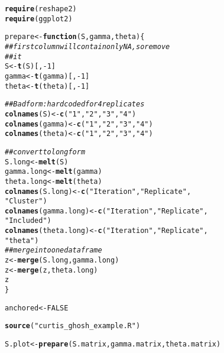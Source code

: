 \documentclass[12pt]{article}\usepackage[]{graphicx}\usepackage[]{color}
\makeatletter
\newcommand{\hlnum}[1]{\textcolor[rgb]{0.686,0.059,0.569}{#1}}%
\newcommand{\hlstr}[1]{\textcolor[rgb]{0.192,0.494,0.8}{#1}}%
\newcommand{\hlcom}[1]{\textcolor[rgb]{0.678,0.584,0.686}{\textit{#1}}}%
\newcommand{\hlopt}[1]{\textcolor[rgb]{0,0,0}{#1}}%
\newcommand{\hlstd}[1]{\textcolor[rgb]{0.345,0.345,0.345}{#1}}%
\newcommand{\hlkwa}[1]{\textcolor[rgb]{0.161,0.373,0.58}{\textbf{#1}}}%
\newcommand{\hlkwb}[1]{\textcolor[rgb]{0.69,0.353,0.396}{#1}}%
\newcommand{\hlkwc}[1]{\textcolor[rgb]{0.333,0.667,0.333}{#1}}%
\newcommand{\hlkwd}[1]{\textcolor[rgb]{0.737,0.353,0.396}{\textbf{#1}}}%
\newenvironment{kframe}{%
 \def\at@end@of@kframe{}%
 \ifinner\ifhmode%
  \def\at@end@of@kframe{\end{minipage}}%
  \begin{minipage}{\columnwidth}%
 \fi\fi%
 \def\FrameCommand##1{\hskip\@totalleftmargin \hskip-\fboxsep
 \colorbox{shadecolor}{##1}\hskip-\fboxsep
     \hskip-\linewidth \hskip-\@totalleftmargin \hskip\columnwidth}%
 \MakeFramed {\advance\hsize-\width
   \@totalleftmargin\z@ \linewidth\hsize
   \@setminipage}}%
 {\par\unskip\endMakeFramed%
 \at@end@of@kframe}
\newenvironment{knitrout}{}{} %
\makeatother
\begin{document}
\begin{knitrout}
\color{fgcolor}\begin{kframe}
\begin{alltt}
\hlkwd{require}\hlstd{(reshape2)}
\hlkwd{require}\hlstd{(ggplot2)}

\hlstd{prepare} \hlkwb{<-} \hlkwa{function}\hlstd{(}\hlkwc{S}\hlstd{,} \hlkwc{gamma}\hlstd{,} \hlkwc{theta}\hlstd{) \{}
  \hlcom{## first column will contain only NA, so remove}
  \hlcom{## it}
  \hlstd{S} \hlkwb{<-} \hlkwd{t}\hlstd{(S)[,} \hlopt{-}\hlnum{1}\hlstd{]}
  \hlstd{gamma} \hlkwb{<-} \hlkwd{t}\hlstd{(gamma)[,} \hlopt{-}\hlnum{1}\hlstd{]}
  \hlstd{theta} \hlkwb{<-} \hlkwd{t}\hlstd{(theta)[,} \hlopt{-}\hlnum{1}\hlstd{]}

  \hlcom{## Bad form: hardcoded for 4 replicates}
  \hlkwd{colnames}\hlstd{(S)} \hlkwb{<-} \hlkwd{c}\hlstd{(}\hlstr{"1"}\hlstd{,} \hlstr{"2"}\hlstd{,} \hlstr{"3"}\hlstd{,} \hlstr{"4"}\hlstd{)}
  \hlkwd{colnames}\hlstd{(gamma)} \hlkwb{<-} \hlkwd{c}\hlstd{(}\hlstr{"1"}\hlstd{,} \hlstr{"2"}\hlstd{,} \hlstr{"3"}\hlstd{,} \hlstr{"4"}\hlstd{)}
  \hlkwd{colnames}\hlstd{(theta)} \hlkwb{<-} \hlkwd{c}\hlstd{(}\hlstr{"1"}\hlstd{,} \hlstr{"2"}\hlstd{,} \hlstr{"3"}\hlstd{,} \hlstr{"4"}\hlstd{)}

  \hlcom{## convert to long form}
  \hlstd{S.long} \hlkwb{<-} \hlkwd{melt}\hlstd{(S)}
  \hlstd{gamma.long} \hlkwb{<-} \hlkwd{melt}\hlstd{(gamma)}
  \hlstd{theta.long} \hlkwb{<-} \hlkwd{melt}\hlstd{(theta)}
  \hlkwd{colnames}\hlstd{(S.long)} \hlkwb{<-} \hlkwd{c}\hlstd{(}\hlstr{"Iteration"}\hlstd{,} \hlstr{"Replicate"}\hlstd{,}
    \hlstr{"Cluster"}\hlstd{)}
  \hlkwd{colnames}\hlstd{(gamma.long)} \hlkwb{<-} \hlkwd{c}\hlstd{(}\hlstr{"Iteration"}\hlstd{,} \hlstr{"Replicate"}\hlstd{,}
    \hlstr{"Included"}\hlstd{)}
  \hlkwd{colnames}\hlstd{(theta.long)} \hlkwb{<-} \hlkwd{c}\hlstd{(}\hlstr{"Iteration"}\hlstd{,} \hlstr{"Replicate"}\hlstd{,}
    \hlstr{"theta"}\hlstd{)}
  \hlcom{## merge into one data frame}
  \hlstd{z} \hlkwb{<-} \hlkwd{merge}\hlstd{(S.long, gamma.long)}
  \hlstd{z} \hlkwb{<-} \hlkwd{merge}\hlstd{(z, theta.long)}
  \hlstd{z}
\hlstd{\}}

\hlstd{anchored} \hlkwb{<-} \hlnum{FALSE}

\hlkwd{source}\hlstd{(}\hlstr{"curtis_ghosh_example.R"}\hlstd{)}

\hlstd{S.plot} \hlkwb{<-} \hlkwd{prepare}\hlstd{(S.matrix, gamma.matrix, theta.matrix)}


\end{alltt}
\end{kframe}
\end{knitrout}
\end{document}
